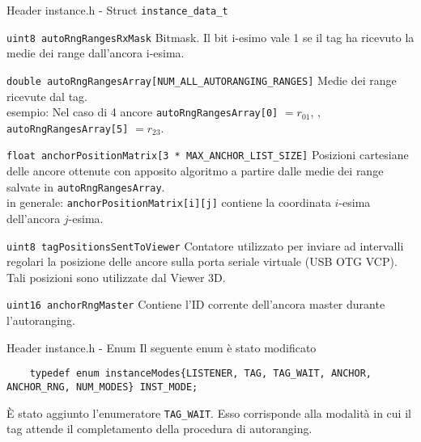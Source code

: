 \begin{frame}[fragile]{Header instance.h - Struct \lstinline!instance_data_t!}
  \begin{block}{\lstinline!uint8 autoRngRangesRxMask!}
    Bitmask. Il bit i-esimo vale 1 se il tag ha ricevuto la medie dei range dall'ancora i-esima.
  \end{block}
  \begin{block}{\lstinline!double autoRngRangesArray[NUM_ALL_AUTORANGING_RANGES]!}
    Medie dei range ricevute dal tag.\\
    \textcolor{dgreen}{esempio:} Nel caso di 4 ancore \lstinline!autoRngRangesArray[0]! $ = r_{01}$,
    \hdots, \lstinline!autoRngRangesArray[5]! $ = r_{23}$.
  \end{block}
  \begin{block}{\lstinline!float anchorPositionMatrix[3 * MAX_ANCHOR_LIST_SIZE]!}
    Posizioni cartesiane delle ancore ottenute con apposito algoritmo a partire dalle medie dei range salvate
    in \lstinline!autoRngRangesArray!.\\
    \alert{in generale:} \lstinline!anchorPositionMatrix[i][j]! contiene la coordinata $i$-esima dell'ancora $j$-esima.
  \end{block}
\end{frame}

\begin{frame}
  \begin{block}{\lstinline!uint8 tagPositionsSentToViewer!}
    Contatore utilizzato per inviare ad intervalli regolari la posizione delle ancore sulla porta seriale
    virtuale (USB OTG VCP). Tali posizioni sono utilizzate dal Viewer 3D.
  \end{block}
  \begin{block}{\lstinline!uint16 anchorRngMaster!}
    Contiene l'ID corrente dell'ancora master durante l'autoranging.
  \end{block}
\end{frame}

\begin{frame}[fragile]{Header instance.h - Enum}
  Il seguente enum è stato modificato
  \begin{lstlisting}
    typedef enum instanceModes{LISTENER, TAG, TAG_WAIT, ANCHOR, ANCHOR_RNG, NUM_MODES} INST_MODE;
  \end{lstlisting}
  È stato aggiunto l'enumeratore \lstinline!TAG_WAIT!. Esso corrisponde alla modalità in cui il tag
  attende il completamento della procedura di autoranging.
\end{frame}


